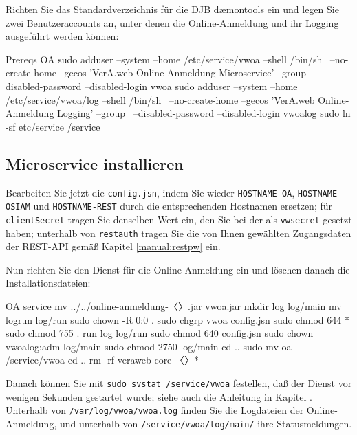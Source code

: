 \documentclass{tarentanleitung}
\newcommand{\vwiaverssw}{1.8.58}
\begin{document}
\begin{minipage}{\linewidth}
Richten Sie das Standardverzeichnis für die DJB dæmontools
ein und legen Sie zwei Benutzeraccounts an, unter denen die
Online-Anmeldung und ihr Logging ausgeführt werden können:

\begin{lstdump}{Prereqs OA}
sudo adduser --system --home /etc/service/vwoa --shell /bin/sh \
    --no-create-home --gecos 'VerA.web Online-Anmeldung Microservice' --group \
    --disabled-password --disabled-login vwoa
sudo adduser --system --home /etc/service/vwoa/log --shell /bin/sh \
    --no-create-home --gecos 'VerA.web Online-Anmeldung Logging' --group \
    --disabled-password --disabled-login vwoalog
sudo ln -sf etc/service /service
\end{lstdump}
\end{minipage}

\subsection{Microservice installieren}\label{subsec:setup-oa-svc}

Bearbeiten Sie jetzt die \texttt{config.jsn}, indem Sie wieder
\texttt{HOSTNAME-OA},
\texttt{HOSTNAME-OSIAM} und \texttt{HOSTNAME-REST} durch die
entsprechenden Hostnamen ersetzen; für \texttt{clientSecret}
tragen Sie denselben Wert ein, den Sie bei der
 als \texttt{vwsecret}
gesetzt haben; unterhalb von \texttt{restauth} tragen Sie die
von Ihnen gewählten Zugangsdaten der REST-API gemäß Kapitel
\ref{manual:restpw} ein.

\begin{minipage}{\linewidth}
Nun richten Sie den Dienst für die Online-Anmeldung ein und
löschen danach die Installationsdateien:

\begin{lstdump}{OA service}
mv ../../online-anmeldung-〈\lstdumpesc{\vwiaverssw}〉.jar vwoa.jar
mkdir log log/main
mv logrun log/run
sudo chown -R 0:0 .
sudo chgrp vwoa config.jsn
sudo chmod 644 *
sudo chmod 755 . run log log/run
sudo chmod 640 config.jsn
sudo chown vwoalog:adm log/main
sudo chmod 2750 log/main
cd ..
sudo mv oa /service/vwoa
cd ..
rm -rf veraweb-core-〈\lstdumpesc{\vwiaverssw}〉*
\end{lstdump}
\end{minipage}

Danach können Sie mit \texttt{sudo svstat /service/vwoa} festellen,
daß der Dienst vor wenigen Sekunden gestartet wurde; siehe
auch die Anleitung in Kapitel .
Unterhalb von \texttt{/var/log/vwoa/vwoa.log} finden Sie die
Logdateien der Online-Anmeldung, und unterhalb von
\texttt{/service/vwoa/log/main/} ihre Statusmeldungen.
\end{document}
